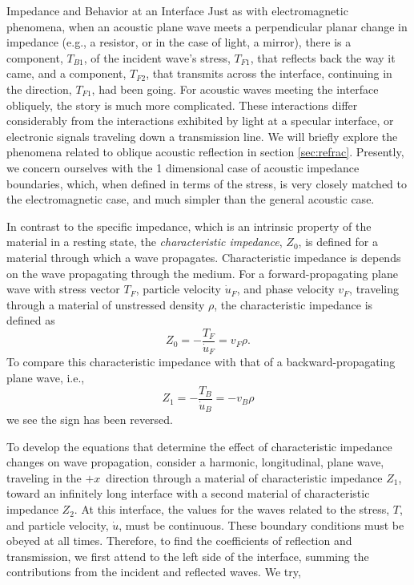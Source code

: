 \documentclass[a4paper,10pt]{report}
\numberwithin{equation}{section}
\begin{document}
{\begin{chapter}
\begin{section}{Impedance and Behavior at an Interface}
Just as with electromagnetic phenomena, when an acoustic plane wave meets a perpendicular planar change in impedance (e.g., a resistor, or in the case of light, a mirror), there is a component, $T_{B1}$, of the incident wave's stress, $T_{F1}$, that reflects back the way it came, and a component, $T_{F2}$, that transmits across the interface, continuing in the direction, $T_{F1}$, had been going. For acoustic waves meeting the interface obliquely, the story is much more complicated. These interactions differ considerably from the interactions exhibited by light at a specular interface, or electronic signals traveling down a transmission line. We will briefly explore the phenomena related to oblique acoustic reflection in section \ref{sec:refrac}. Presently, we concern ourselves with the 1 dimensional case of acoustic impedance boundaries, which, when defined in terms of the stress, is very closely matched to the electromagnetic case, and much simpler than the general acoustic case.
\par
In contrast to the specific impedance, which is an intrinsic property of the material in a resting state, the \emph{characteristic impedance}, $Z_0$, is defined for a material through which a wave propagates. Characteristic impedance is depends on the wave propagating through the medium. For a forward-propagating plane wave with stress vector $T_F$, particle velocity $\dot{u}_F$, and phase velocity $v_F$, traveling through a material of unstressed density $\rho$, the characteristic impedance is defined as
\begin{equation}
 Z_0 = -\frac{T_F}{\dot{u}_F} = v_F \rho \text{.}
\end{equation}
To compare this characteristic impedance with that of a backward-propagating plane wave, i.e.,
\begin{equation}
Z_1 = -\frac{T_B}{\dot{u}_B} = -v_B \rho
\end{equation}
we see the sign has been reversed.
\par
To develop the equations that determine the effect of characteristic impedance changes on wave propagation, consider a harmonic, longitudinal, plane wave, traveling in the $+x$\  direction through a material of characteristic impedance $Z_1$, toward an infinitely long interface with a second material of characteristic impedance $Z_2$. At this interface, the values for the waves related to the stress, $T$, and particle velocity, $\dot{u}$, must be continuous. These boundary conditions must be obeyed at all times. Therefore, to find the coefficients of reflection and transmission, we first attend to the left side of the interface, summing the contributions from the incident and reflected waves. We try, \cite[p.~10]{Kino1987}

\end{section}
\end{chapter}}
\end{document}
